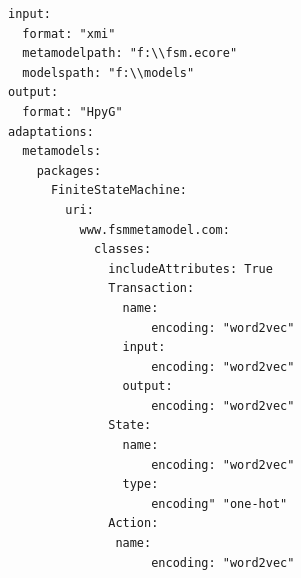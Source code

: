 \documentclass[journal,article,submit,moreauthors,technologies]{Definitions/mdpi}
\begin{document}
\begin{program_}[H]
\footnotesize

\begin{verbatim}
input:
  format: "xmi"
  metamodelpath: "f:\\fsm.ecore"
  modelspath: "f:\\models"
output:
  format: "HpyG"
adaptations:
  metamodels:
    packages:
      FiniteStateMachine:
        uri:
          www.fsmmetamodel.com:
            classes:
              includeAttributes: True
              Transaction:
                name:
                    encoding: "word2vec"
                input:
                    encoding: "word2vec"
                output:
                    encoding: "word2vec"
              State:
                name:
                    encoding: "word2vec"
                type:
                    encoding" "one-hot"
              Action:
               name:
                    encoding: "word2vec"
\end{verbatim}
\caption{A sample MoEGL program for encoding instance models similar to Figure~\ref{fig:objectdiagram}.}
\label{code:YamlFSMattributes}
\end{program_}
\end{document}
